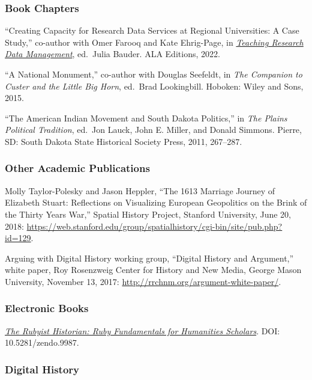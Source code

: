 \subsubsection{Book Chapters}\label{book-chapters}

``Creating Capacity for Research Data Services at Regional Universities:
A Case Study,'' co-author with Omer Farooq and Kate Ehrig-Page, in
\emph{\href{https://www.alastore.ala.org/trdm}{Teaching Research Data
Management}}, ed.~Julia Bauder. ALA Editions, 2022.

``A National Monument,'' co-author with Douglas Seefeldt, in \emph{The
Companion to Custer and the Little Big Horn}, ed.~Brad Lookingbill.
Hoboken: Wiley and Sons, 2015.

``The American Indian Movement and South Dakota Politics,'' in \emph{The
Plains Political Tradition}, ed.~Jon Lauck, John E. Miller, and Donald
Simmons. Pierre, SD: South Dakota State Historical Society Press, 2011,
267--287.

\subsubsection{Other Academic
Publications}\label{other-academic-publications}

Molly Taylor-Polesky and Jason Heppler, ``The 1613 Marriage Journey of
Elizabeth Stuart: Reflections on Visualizing European Geopolitics on the
Brink of the Thirty Years War,'' Spatial History Project, Stanford
University, June 20, 2018:
\url{https://web.stanford.edu/group/spatialhistory/cgi-bin/site/pub.php?id=129}.

Arguing with Digital History working group, ``Digital History and
Argument,'' white paper, Roy Rosenzweig Center for History and New
Media, George Mason University, November 13, 2017:
\url{http://rrchnm.org/argument-white-paper/}.

\subsubsection{Electronic Books}\label{electronic-books}

\emph{\href{http://hepplerj.github.io/rubyist-historian/}{The Rubyist
Historian: Ruby Fundamentals for Humanities Scholars}}. DOI:
10.5281/zendo.9987.

\subsubsection{Digital History}\label{digital-history}

